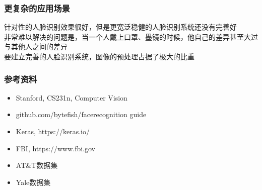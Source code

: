 \documentclass[24pt]{beamer}
\begin{document}
\begin{frame}
\frametitle{更复杂的应用场景}
针对性的人脸识别效果很好，但是更宽泛稳健的人脸识别系统还没有完善好\\
\bigskip
非常难以解决的问题是，当一个人戴上口罩、墨镜的时候，他自己的差异甚至大过与其他人之间的差异\\
\bigskip
要建立完善的人脸识别系统，图像的预处理占据了极大的比重
\end{frame}
\begin{frame}
\frametitle{参考资料}
\begin{itemize}
\item Stanford, CS231n, Computer Vision\\
\item github.com/bytefish/facerecognition guide\\
\item Keras, https://keras.io/
\item FBI, https://www.fbi.gov
\item AT\&T数据集\\
\item Yale数据集\\
\end{itemize}
\end{frame}
\end{document}
